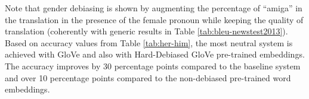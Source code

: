 \documentclass[11pt,a4paper]{article}
\begin{document}


Note that gender debiasing is shown by augmenting the percentage of ``amiga'' in the translation in the presence of the female pronoun while keeping the quality of translation (coherently with generic results in Table \ref{tab:bleu-newstest2013}). 
Based on accuracy values from Table \ref{tab:her-him}, the most neutral system is achieved with GloVe and also with Hard-Debiased GloVe pre-trained embeddings. The accuracy improves by 30 percentage points compared to the baseline system and over 10 percentage points compared to the non-debiased pre-trained word embeddings.


\end{document}
